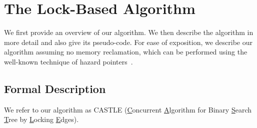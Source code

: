 \newenvironment{limitscope}{}{}
\begin{limitscope}
\newcommand{\accesspath}{access-path}
\newcommand{\terminalnode}{terminal node}

\newcommand{\true}{\textsf{true}}
\newcommand{\false}{\textsf{false}}

\newcommand{\CAS}{\textsf{CAS}}

\newcommand{\sNodeOne}{\mathbb{R}}
\newcommand{\sNodeTwo}{\mathbb{S}}
\newcommand{\sKeyOne}{\infty_1}
\newcommand{\sKeyTwo}{\infty_2}

\newcommand{\targetnode}{target node}
\newcommand{\anchornode}{anchor node}

\newcommand{\myparent}{parent}
\newcommand{\myleft}{le\!f\!t}
\newcommand{\myright}{right}

\newcommand{\CASTLE}{\textsc{CASTLE}}
\newcommand{\CITRUS}{\textsc{CITRUS}}
\newcommand{\HJBST}{\textsc{LF-IBST}}
\newcommand{\NMBST}{\textsc{LF-EBST}}

\newcommand{\RemoveChild}{\textsc{RemoveChild}}
\newcommand{\LockAll}{\textsc{LockAll}}
\newcommand{\UnlockAll}{\textsc{UnlockAll}}
\newcommand{\ClearFlags}{\textsc{ClearFlags}}
\newcommand{\FindSmallest}{\textsc{FindSmallest}}

\newcommand{\lFlag}{lFlag}
\newcommand{\mFlag}{mFlag}
\newcommand{\nFlag}{nFlag}


\section{The Lock-Based Algorithm}
\label{sec:algorithm}
We first provide an overview of our algorithm. We then describe the algorithm in more detail and also give its pseudo-code. For ease of exposition, we describe our algorithm assuming no memory reclamation, which can be performed using the well-known technique of hazard pointers~\cite{Mic:2004:TPDS}.





\subsection{Formal Description}

We refer to our algorithm as \CASTLE{} (\underline{C}oncurrent \underline{A}lgorithm for Binary \underline{S}earch \underline{T}ree by \underline{L}ocking \underline{E}dges). 


\end{limitscope}
